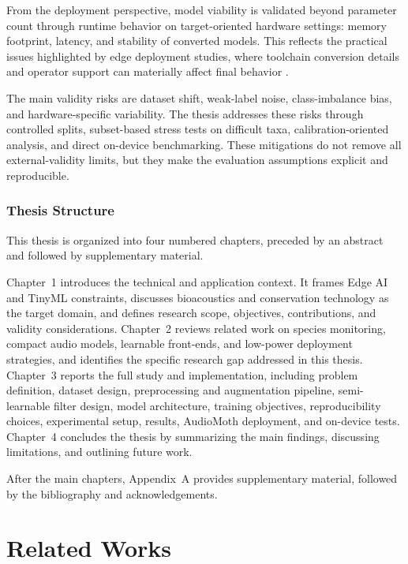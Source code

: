 \documentclass[a4paper,singleside,12pt]{report} %
\begin{document}
	From the deployment perspective, model viability is validated beyond parameter count through runtime behavior on target-oriented hardware settings: memory footprint, latency, and stability of converted models. This reflects the practical issues highlighted by edge deployment studies, where toolchain conversion details and operator support can materially affect final behavior \cite{abadade2023tinymlsurvey,singh2023edgeaisurvey,zylinski2024deployment}.

	The main validity risks are dataset shift, weak-label noise, class-imbalance bias, and hardware-specific variability. The thesis addresses these risks through controlled splits, subset-based stress tests on difficult taxa, calibration-oriented analysis, and direct on-device benchmarking. These mitigations do not remove all external-validity limits, but they make the evaluation assumptions explicit and reproducible.

	\subsection{Thesis Structure}
	This thesis is organized into four numbered chapters, preceded by an abstract and followed by supplementary material.

	Chapter~1 introduces the technical and application context. It frames Edge AI and TinyML constraints, discusses bioacoustics and conservation technology as the target domain, and defines research scope, objectives, contributions, and validity considerations.
	Chapter~2 reviews related work on species monitoring, compact audio models, learnable front-ends, and low-power deployment strategies, and identifies the specific research gap addressed in this thesis.
	Chapter~3 reports the full study and implementation, including problem definition, dataset design, preprocessing and augmentation pipeline, semi-learnable filter design, model architecture, training objectives, reproducibility choices, experimental setup, results, AudioMoth deployment, and on-device tests.
	Chapter~4 concludes the thesis by summarizing the main findings, discussing limitations, and outlining future work.

	After the main chapters, Appendix~A provides supplementary material, followed by the bibliography and acknowledgements.

	\chapter{Related Works}
\end{document}

